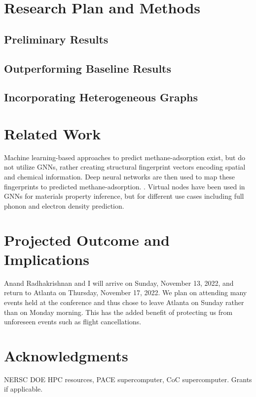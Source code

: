 \documentclass{lxaiproposal}
\begin{document}
\section*{Research Plan and Methods}

\subsection{Preliminary Results}

\subsection{Outperforming Baseline Results}

\subsection{Incorporating Heterogeneous Graphs}

\section*{Related Work}

Machine learning-based approaches to predict methane-adsorption exist, but do not utilize GNNs, rather creating structural fingerprint vectors encoding spatial and chemical information. Deep neural networks are then used to map these fingerprints to predicted methane-adsorption. \cite{gurnani2021interpretable}. 
Virtual nodes have been used in GNNs for materials property inference, but for different use cases including full phonon\cite{https://doi.org/10.48550/arxiv.2010.09435} and electron density prediction\cite{jorgensen2022equivariant}.

\section*{Projected Outcome and Implications}

Anand Radhakrishnan and I will arrive on Sunday, November 13, 2022, and return to Atlanta on Thursday, November 17, 2022. We plan on attending many events held at the conference and thus chose to leave Atlanta on Sunday rather than on Monday morning. This has the added benefit of protecting us from unforeseen events such as flight cancellations.

\section*{Acknowledgments}

NERSC DOE HPC resources, PACE supercomputer, CoC supercomputer. Grants if applicable.



\end{document}
